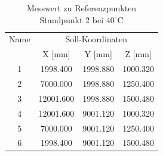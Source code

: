 \begin{table}[h]\label{tab:ausdehnung4}
\centering
\caption{Messwert zu Referenzpunkten Standpunkt 2 bei $40^\circ\text{C}$}

\begin{tabular}{cccc}
\toprule
\multicolumn{1}{c|}{Name} &
\multicolumn{3}{c}{Soll-Koordinaten} \\
\multicolumn{1}{c|}{} &
\multicolumn{1}{c|}{X [mm]} &
\multicolumn{1}{c|}{Y [mm]} &
\multicolumn{1}{c}{Z [mm]} \\
\midrule

\multicolumn{1}{c|}{1} &
\multicolumn{1}{c|}{1998.400} &
\multicolumn{1}{c|}{1998.880} &
\multicolumn{1}{c}{1000.320} \\

\multicolumn{1}{c|}{2} &
\multicolumn{1}{c|}{7000.000} &
\multicolumn{1}{c|}{1998.880} &
\multicolumn{1}{c}{1250.400} \\

\multicolumn{1}{c|}{3} &
\multicolumn{1}{c|}{12001.600} &
\multicolumn{1}{c|}{1998.880} &
\multicolumn{1}{c}{1500.480} \\

\multicolumn{1}{c|}{4} &
\multicolumn{1}{c|}{12001.600} &
\multicolumn{1}{c|}{9001.120} &
\multicolumn{1}{c}{1000.320} \\

\multicolumn{1}{c|}{5} &
\multicolumn{1}{c|}{7000.000} &
\multicolumn{1}{c|}{9001.120} &
\multicolumn{1}{c}{1250.400} \\

\multicolumn{1}{c|}{6} &
\multicolumn{1}{c|}{1998.400} &
\multicolumn{1}{c|}{9001.120} &
\multicolumn{1}{c}{1500.480} \\
\bottomrule
\end{tabular}
\end{table}

